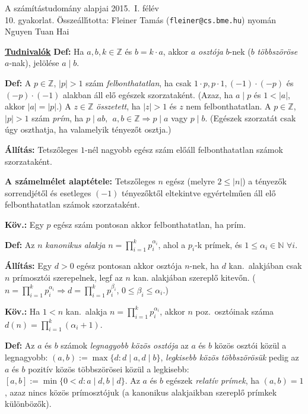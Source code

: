 \documentclass[a4paper, 12pt]{article}
\newcommand{\defi}{{\bf Def:} }
\newcommand{\kov}{{\bf Köv.:} }
\newcommand{\all}{{\bf Állítás:} }
\newcommand{\Z}{{\mathbb Z}}
\newcommand{\N}{{\mathbb N}}
\begin{document}
\begin{center}
{\huge A számítástudomány alapjai 2015.\ I. félév}\\ 
{\large 10. gyakorlat.
\"Ossze\'all\'\i totta: Fleiner Tam\'as ({\tt fleiner@cs.bme.hu}) nyomán Nguyen Tuan Hai}
\end{center}

\noindent
{\bf\large\underline{Tudnivalók}}
\defi Ha $a,b,k\in \Z$ és $b=k\cdot a$, akkor $a$ \emph{osztója} $b$-nek
($b$ \emph{többszöröse} $a$-nak), jelölése $a\mid b$.

\defi A $p\in\Z$, $|p|>1$ szám \emph{felbonthatatlan}, ha csak $1\cdot p,
p\cdot 1, (-1)\cdot (-p)$ és $(-p)\cdot (-1)$ alakban áll elő egészek
szorzataként. (Azaz, ha $a\mid p$ és $1<|a|$, akkor $|a|=|p|$.)  A $z\in\Z$
\emph{összetett}, ha $|z|>1$ és $z$ nem felbonthatatlan. A $p\in\Z$,
$|p|>1$ szám \emph{prím}, ha $p\mid ab,~~ a,b\in\Z\Rightarrow p\mid a$ vagy
$p\mid b$.  (Egészek szorzatát csak úgy oszthatja, ha valamelyik tényezőt
osztja.)

\all Tetszőleges $1$-nél nagyobb egész szám előáll felbonthatatlan számok
szorzataként. 

{\bf A számelmélet alaptétele:} Tetszőleges $n$ egész (melyre $2\le |n|$) a
tényezők sorrendjétől és esetleges $(-1)$ tényezőktől eltekintve
egyértelműen áll elő felbonthatatlan számok szorzataként.

\kov Egy $p$ egész szám pontosan akkor felbonthatatlan, ha prím.

\defi Az $n$ \emph{kanonikus alakja} $n=\prod_{i=1}^kp_i^{\alpha_i}$, ahol a
$p_i$-k prímek, és $1\le \alpha _i\in \N$  $\forall i$.

\all %
Egy $d>0$ egész
pontosan akkor osztója $n$-nek, ha $d$ kan.\ alakjában csak $n$
prímosztói szerepelnek, legf az $n$ kan. alakjában szereplő kitevőn.
($n=\prod_{i=1}^kp_i^{\alpha_i}\Rightarrow d=\prod_{i=1}^kp_i^{\beta_i}$,
$0\le \beta_i\le \alpha _i$.) 

\kov Ha $1<n$ kan.\ alakja $n=\prod_{i=1}^kp_i^{\alpha_i}$, akkor
$n$ poz.\ osztóinak száma $d(n)=\prod_{i=1}^k (\alpha_i+1)$.
\iffalse és $\sigma(n)=\prod_{i=1}^k\sum_{j=0}^{\alpha_i}
p_i^j=\prod_{i=1}^k\frac{p_i^{1+\alpha_i}-1}{p_i-1}$ az $n$ pozitív
osztóinak összege.
\fi



\defi Az $a$ és $b$ számok \emph{legnagyobb közös osztója} az $a$ és $b$
közös osztói közül a legnagyobb: $(a,b):=\max\{d:d\mid a, d\mid b\}$,
\emph{legkisebb közös többszörösük} pedig az $a$ és $b$ pozitív közös
többszörösei közül a legkisebb: $[a,b]:=\min\{0<d:a\mid d, b\mid d\}$. Az
$a$ és $b$ egészek \emph{relatív prímek}, ha $(a,b)=1$, azaz nincs közös
prímosztójuk (a kanonikus alakjaikban szereplő prímkek különbözők).
\end{document}
